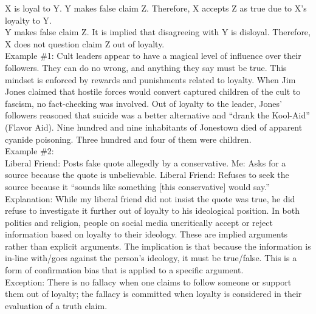 \documentclass[a4paper,12pt,single,pdftex]{scrbook}
\begin{document}
      
        X is loyal to Y. \newline
Y makes false claim Z. \newline
Therefore, X accepts Z as true due to X’s loyalty to Y.
      \\

      
        Y makes false claim Z. \newline
It is implied that disagreeing with Y is disloyal. \newline
Therefore, X does not question claim Z out of loyalty.
      \\

      
        Example \#1: Cult leaders appear to have a magical level of influence over their followers. They can do no wrong, and anything they say must be true. This mindset is enforced by rewards and punishments related to loyalty. When Jim Jones claimed that hostile forces would convert captured children of the cult to fascism, no fact-checking was involved. Out of loyalty to the leader, Jones’ followers reasoned that suicide was a better alternative and “drank the Kool-Aid” (Flavor Aid). Nine hundred and nine inhabitants of Jonestown died of apparent cyanide poisoning. Three hundred and four of them were children.
      \\

      
        Example \#2: 
      \\

      
        Liberal Friend: Posts fake quote allegedly by a conservative. \newline
Me: Asks for a source because the quote is unbelievable. \newline
Liberal Friend: Refuses to seek the source because it “sounds like something [this conservative] would say.”
      \\

      
        Explanation: While my liberal friend did not insist the quote was true, he did refuse to investigate it further out of loyalty to his ideological position. In both politics and religion, people on social media uncritically accept or reject information based on loyalty to their ideology. These are implied arguments rather than explicit arguments. The implication is that because the information is in-line with/goes against the person’s ideology, it must be true/false. This is a form of confirmation bias that is applied to a specific argument.
      \\

      
        Exception: There is no fallacy when one claims to follow someone or support them out of loyalty; the fallacy is committed when loyalty is considered in their evaluation of a truth claim.
      \\
\end{document}
